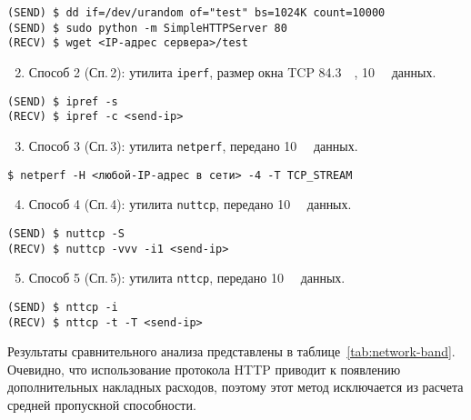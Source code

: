\noindent
\begin{lstlisting}
(SEND) $ dd if=/dev/urandom of="test" bs=1024K count=10000
(SEND) $ sudo python -m SimpleHTTPServer 80
(RECV) $ wget <IP-адрес сервера>/test
\end{lstlisting}

\begin{enumerate}
\setcounter{enumi}{1}
\item  Способ 2 (Сп.\,2): утилита \texttt{iperf}, размер окна TCP \SI{84,3}{\kilo\byte}, \SI{10}{\giga\byte} данных.
\end{enumerate}

\noindent
\begin{lstlisting}
(SEND) $ ipref -s
(RECV) $ ipref -c <send-ip>
\end{lstlisting}

\begin{enumerate}
\setcounter{enumi}{2}
\item Способ 3 (Сп.\,3): утилита \texttt{netperf}, передано \SI{10}{\giga\byte} данных.
\end{enumerate}

\noindent
\begin{lstlisting}
$ netperf -H <любой-IP-адрес в сети> -4 -T TCP_STREAM
\end{lstlisting}

\begin{enumerate}
\setcounter{enumi}{3}
\item Способ 4 (Сп.\,4): утилита \texttt{nuttcp}, передано \SI{10}{\giga\byte} данных.
\end{enumerate}
\noindent
\begin{lstlisting}
(SEND) $ nuttcp -S
(RECV) $ nuttcp -vvv -i1 <send-ip>
\end{lstlisting}

\begin{enumerate}
\setcounter{enumi}{4}
\item Способ 5 (Сп.\,5): утилита \texttt{nttcp}, передано \SI{10}{\giga\byte} данных.
\end{enumerate}

\noindent
\begin{lstlisting}
(SEND) $ nttcp -i
(RECV) $ nttcp -t -T <send-ip>
\end{lstlisting}

Результаты сравнительного анализа представлены в таблице~\cref{tab:network-band}. Очевидно, что использование протокола HTTP приводит к появлению дополнительных накладных расходов, поэтому этот метод исключается из расчета средней пропускной способности.

